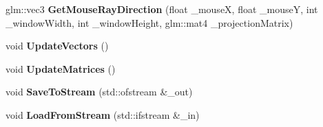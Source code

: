 \begin{DoxyCompactItemize}
glm\+::vec3 {\bfseries Get\+Mouse\+Ray\+Direction} (float \+\_\+mouseX, float \+\_\+mouseY, int \+\_\+window\+Width, int \+\_\+window\+Height, glm\+::mat4 \+\_\+projection\+Matrix)
\item 
\mbox{\label{classpiolot_1_1_camera_a3e5675563dc81e8526c012e54cb92c9f}} 
void {\bfseries Update\+Vectors} ()
\item 
\mbox{\label{classpiolot_1_1_camera_a93e6bf77b4c9a6a1402a4866dc2590e9}} 
void {\bfseries Update\+Matrices} ()
\item 
\mbox{\label{classpiolot_1_1_camera_abd25ede2299da256764a59e991a8e25a}} 
void {\bfseries Save\+To\+Stream} (std\+::ofstream \&\+\_\+out)
\item 
\mbox{\label{classpiolot_1_1_camera_acca1f703bec64c28d501760920cf8d57}} 
void {\bfseries Load\+From\+Stream} (std\+::ifstream \&\+\_\+in)
\end{DoxyCompactItemize}
